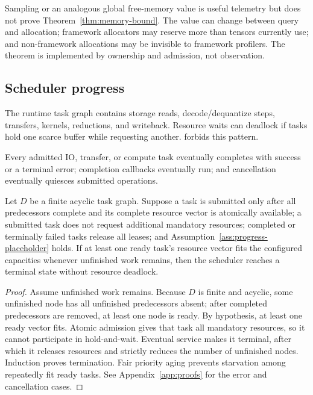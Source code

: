 \begin{remark}
Sampling  or an analogous global free-memory value is useful telemetry but does not prove Theorem~\ref{thm:memory-bound}. The value can change between query and allocation; framework allocators may reserve more than tensors currently use; and non-framework allocations may be invisible to framework profilers. The theorem is implemented by ownership and admission, not observation.
\end{remark}

\subsection{Scheduler progress}

The runtime task graph contains storage reads, decode/dequantize steps, transfers, kernels, reductions, and writeback. Resource waits can deadlock if tasks hold one scarce buffer while requesting another. \AMS forbids this pattern.

\begin{assumption}\label{ass:progress-placeholder}
Every admitted IO, transfer, or compute task eventually completes with success or a terminal error; completion callbacks eventually run; and cancellation eventually quiesces submitted operations.
\end{assumption}

\begin{theorem}
\label{thm:progress}
Let $D$ be a finite acyclic task graph. Suppose a task is submitted only after all predecessors complete and its complete resource vector is atomically available; a submitted task does not request additional mandatory resources; completed or terminally failed tasks release all leases; and Assumption~\ref{ass:progress-placeholder} holds. If at least one ready task's resource vector fits the configured capacities whenever unfinished work remains, then the scheduler reaches a terminal state without resource deadlock.
\end{theorem}

\begin{proof}
Assume unfinished work remains. Because $D$ is finite and acyclic, some unfinished node has all unfinished predecessors absent; after completed predecessors are removed, at least one node is ready. By hypothesis, at least one ready vector fits. Atomic admission gives that task all mandatory resources, so it cannot participate in hold-and-wait. Eventual service makes it terminal, after which it releases resources and strictly reduces the number of unfinished nodes. Induction proves termination. Fair priority aging prevents starvation among repeatedly fit ready tasks. See Appendix~\ref{app:proofs} for the error and cancellation cases.
\end{proof}

